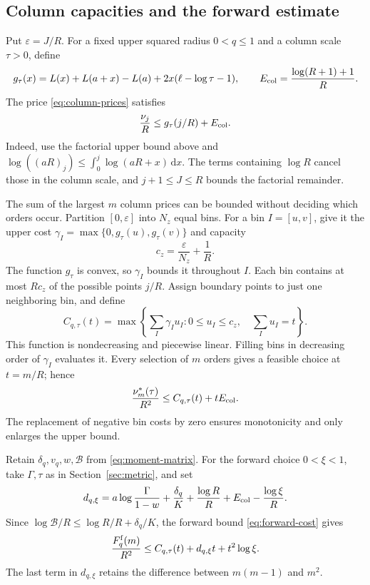 \subsection{Column capacities and the forward estimate}
Put $\varepsilon=J/R$. For a fixed upper squared radius $0<q\leq1$
and a column scale $\tau>0$, define
\[
 g_\tau(x)=L(x)+L(a+x)-L(a)
                  +2x(\ell-\log\tau-1),
 \qquad E_{\rm col}=\frac{\log(R+1)+1}{R}.
\]
The price \eqref{eq:column-prices} satisfies
\begin{equation}\label{eq:column-finite-error}
 \frac{\nu_j}{R}\leq g_\tau(j/R)+E_{\rm col}.
\end{equation}
Indeed, use the factorial upper bound above and
$\log((aR)_j)\leq\int_0^j\log(aR+x)\,\mathrm dx$.
The terms containing $\log R$ cancel those in the column scale, and
$j+1\leq J\leq R$ bounds the factorial remainder.

The sum of the largest $m$ column prices can be bounded without deciding
which orders occur. Partition $[0,\varepsilon]$ into $N_z$ equal bins.
For a bin $I=[u,v]$, give it the upper cost
$\gamma_I=\max\{0,g_\tau(u),g_\tau(v)\}$ and capacity
\[
 c_z=\frac{\varepsilon}{N_z}+\frac1R.
\]
The function $g_\tau$ is convex, so $\gamma_I$ bounds it throughout
$I$. Each bin contains at most $Rc_z$ of the possible points $j/R$.
Assign boundary points to just one neighboring bin, and define
\[
 C_{q,\tau}(t)
 =\max\left\{\sum_I\gamma_I u_I:
                0\leq u_I\leq c_z,\quad\sum_Iu_I=t\right\}.
\]
This function is nondecreasing and piecewise linear. Filling bins in
decreasing order of $\gamma_I$ evaluates it. Every selection of $m$
orders gives a feasible choice at $t=m/R$; hence
\[
 \frac{\nu_m^*(\tau)}{R^2}\leq C_{q,\tau}(t)+tE_{\rm col}.
\]
The replacement of negative bin costs by zero ensures monotonicity and
only enlarges the upper bound.

Retain $\delta_q,v_q,w,\mathcal B$ from
\eqref{eq:moment-matrix}. For the forward choice $0<\xi<1$, take
$\Gamma,\tau$ as in Section~\ref{sec:metric}, and set
\[
 d_{q,\xi}=a\log\frac\Gamma{1-w}+\frac{\delta_q}{K}
             +\frac{\log R}{R}+E_{\rm col}-\frac{\log\xi}{R}.
\]
Since $\log\mathcal B/R\leq\log R/R+\delta_q/K$, the forward
bound \eqref{eq:forward-cost} gives
\begin{equation}\label{eq:forward-finite}
 \frac{F_q^{\rm f}(m)}{R^2}
 \leq C_{q,\tau}(t)+d_{q,\xi}t+t^2\log\xi.
\end{equation}
The last term in $d_{q,\xi}$ retains the difference between
$m(m-1)$ and $m^2$.

